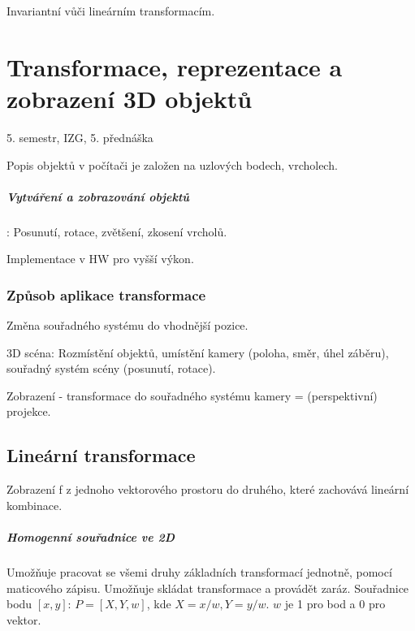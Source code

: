 \documentclass[a4paper, 11pt]{report}
\begin{document}
Invariantní vůči lineárním transformacím.





























\chapter{Transformace, reprezentace a zobrazení 3D objektů} \label{cha:12}

5. semestr, IZG, 5. přednáška

Popis objektů v počítači je založen na uzlových bodech, vrcholech.

\paragraph{Vytváření a zobrazování objektů}: Posunutí, rotace, zvětšení, zkosení vrcholů.

Implementace v HW pro vyšší výkon.

\subsection{Způsob aplikace transformace}
Změna souřadného systému do vhodnější pozice.

3D scéna: Rozmístění objektů, umístění kamery (poloha, směr, úhel záběru), souřadný systém scény (posunutí, rotace).

Zobrazení - transformace do souřadného systému kamery = (perspektivní) projekce.

\section{Lineární transformace}

Zobrazení f z jednoho vektorového prostoru do druhého, které zachovává lineární kombinace.

\paragraph{Homogenní souřadnice ve 2D}
Umožňuje pracovat se všemi druhy základních transformací jednotně, pomocí maticového zápisu. Umožňuje skládat transformace a provádět zaráz. Souřadnice bodu $[x, y]$: $P = [X, Y, w]$, kde $X = x/w, Y = y/w$. $w$ je 1 pro bod a 0 pro vektor.
\end{document}
